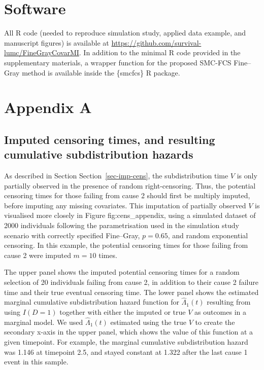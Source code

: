\documentclass[
  letterpaper,
  DIV=11,
  numbers=noendperiod]{scrreprt}
\begin{document}
\hypertarget{software-2}{%
\section*{Software}\label{software-2}}


All R code (needed to reproduce simulation study, applied data example,
and manuscript figures) is available at
\url{https://github.com/survival-lumc/FineGrayCovarMI}. In addition to
the minimal R code provided in the supplementary materials, a wrapper
function for the proposed SMC-FCS Fine--Gray method is available inside
the \{smcfcs\} R package.

\hypertarget{appendix-a-1}{%
\section*{Appendix A}\label{appendix-a-1}}


\hypertarget{imputed-censoring-times-and-resulting-cumulative-subdistribution-hazards}{%
\subsection*{Imputed censoring times, and resulting cumulative
subdistribution
hazards}\label{imputed-censoring-times-and-resulting-cumulative-subdistribution-hazards}}

As described in Section Section~\ref{sec-imp-cens}, the subdistribution
time \(V\) is only partially observed in the presence of random
right-censoring. Thus, the potential censoring times for those failing
from cause 2 should first be multiply imputed, before imputing any
missing covariates. This imputation of partially observed \(V\) is
visualised more closely in Figure fig:cens\_appendix, using a simulated
dataset of 2000 individuals following the parametrisation used in the
simulation study scenario with correctly specified Fine--Gray,
\(p = 0.65\), and random exponential censoring. In this example, the
potential censoring times for those failing from cause 2 were imputed
\(m = 10\) times.

The upper panel shows the imputed potential censoring times for a random
selection of 20 individuals failing from cause 2, in addition to their
cause 2 failure time and their true eventual censoring time. The lower
panel shows the estimated marginal cumulative subdistribution hazard
function for \(\hat{\Lambda}_1(t)\) resulting from using \(I(D = 1)\)
together with either the imputed or true \(V\) as outcomes in a marginal
model. We used \(\hat{\Lambda}_1(t)\) estimated using the true \(V\) to
create the secondary x-axis in the upper panel, which shows the value of
this function at a given timepoint. For example, the marginal cumulative
subdistribution hazard was 1.146 at timepoint 2.5, and stayed constant
at 1.322 after the last cause 1 event in this sample.
\end{document}
